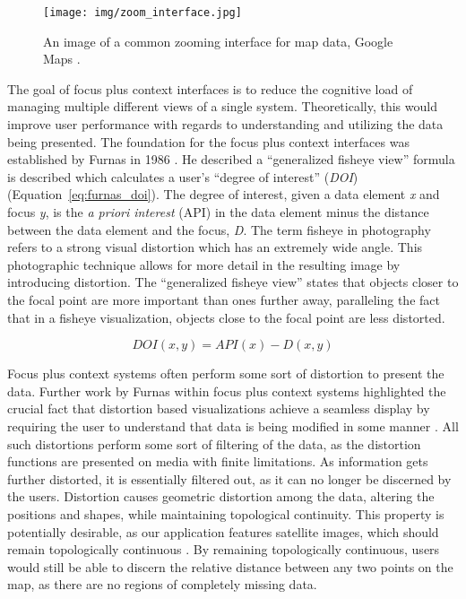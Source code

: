 \begin{figure}[htp] \centering
    \texttt{[image: img/zoom\_interface.jpg]}
    \caption[Zooming Interface]{An image of a common zooming interface for map data, Google Maps \cite{google_maps}.}
    \label{fig:google_maps}
\end{figure}

The goal of focus plus context interfaces is to reduce the cognitive load of managing multiple different views 
of a single system. Theoretically, this would improve user performance with regards to understanding and 
utilizing the data being presented. The foundation for the focus plus context interfaces was established by Furnas in 1986
\cite{Furnas1986}. He described a ``generalized fisheye view'' formula is described which 
calculates a user's ``degree of interest'' (\emph{DOI}) \cite{Furnas1986} (Equation~\ref{eq:furnas_doi}). The degree of interest, given a data element \emph{x} and focus \emph{y}, is the \emph{a priori interest} (API) in the data element minus the distance between the data element and the focus, \emph{D}.  The term fisheye in photography refers to a strong visual distortion which has an extremely wide angle. This photographic technique allows for more detail
in the resulting image by introducing distortion. The ``generalized fisheye view'' states that objects closer to the focal point are more important than ones further away, paralleling the fact that in a fisheye visualization, objects close to the focal point are less distorted.

\begin{equation}
    \label{eq:furnas_doi} 
    DOI(x, y) = API(x) - D(x,y)
\end{equation}

Focus plus context systems often perform some sort of distortion to present the data. Further work by Furnas within focus plus context systems highlighted the crucial fact that distortion based visualizations achieve a seamless display by requiring the user to understand that data is being modified in some manner \cite{Furnas2006}. All such distortions perform some sort of filtering of the data, as the distortion functions are presented on media with finite limitations. As information
gets further distorted, it is essentially filtered out, as it can no longer be discerned by the users. Distortion causes geometric distortion among the data, altering the positions and shapes, while maintaining topological continuity. This property is potentially desirable, as our application features satellite images, which should remain topologically continuous \cite{Furnas2006}. By remaining topologically continuous, users would still be able to discern the
relative distance between any two points on the map, as there are no regions of completely missing data.


